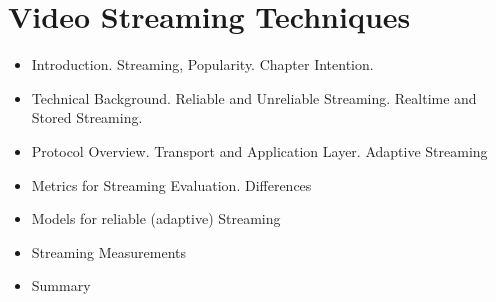 \chapter{Video Streaming Techniques}
\label{chap:streaming}

\begin{itemize}
\item Introduction. Streaming, Popularity. Chapter Intention.
\item Technical Background. Reliable and Unreliable Streaming. Realtime and Stored Streaming.
\item Protocol Overview. Transport and Application Layer. Adaptive Streaming
\item Metrics for Streaming Evaluation. Differences 
\item Models for reliable (adaptive) Streaming
\item Streaming Measurements
\item Summary
\end{itemize}


  


  






    
